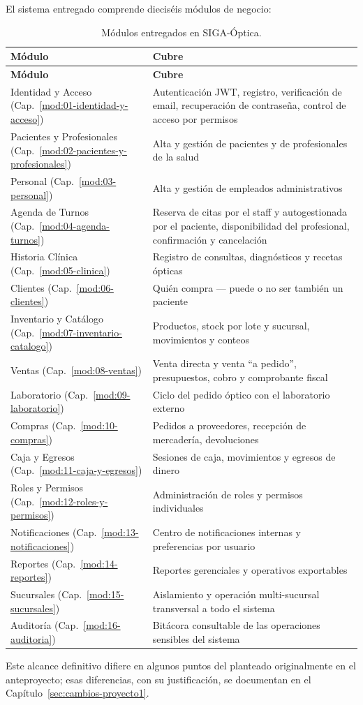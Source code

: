 El sistema entregado comprende dieciséis módulos de negocio:

\begin{longtable}{p{4.2cm}p{9.4cm}}
\caption{Módulos entregados en SIGA-Óptica.}
\label{tab:resumen-modulos}\\
\toprule
\textbf{Módulo} & \textbf{Cubre} \\
\midrule
\endfirsthead
\toprule
\textbf{Módulo} & \textbf{Cubre} \\
\midrule
\endhead
\bottomrule
\endfoot
Identidad y Acceso (Cap.~\ref{mod:01-identidad-y-acceso}) & Autenticación JWT, registro, verificación de email, recuperación de contraseña, control de acceso por permisos \\
Pacientes y Profesionales (Cap.~\ref{mod:02-pacientes-y-profesionales}) & Alta y gestión de pacientes y de profesionales de la salud \\
Personal (Cap.~\ref{mod:03-personal}) & Alta y gestión de empleados administrativos \\
Agenda de Turnos (Cap.~\ref{mod:04-agenda-turnos}) & Reserva de citas por el staff y autogestionada por el paciente, disponibilidad del profesional, confirmación y cancelación \\
Historia Clínica (Cap.~\ref{mod:05-clinica}) & Registro de consultas, diagnósticos y recetas ópticas \\
Clientes (Cap.~\ref{mod:06-clientes}) & Quién compra --- puede o no ser también un paciente \\
Inventario y Catálogo (Cap.~\ref{mod:07-inventario-catalogo}) & Productos, stock por lote y sucursal, movimientos y conteos \\
Ventas (Cap.~\ref{mod:08-ventas}) & Venta directa y venta ``a pedido'', presupuestos, cobro y comprobante fiscal \\
Laboratorio (Cap.~\ref{mod:09-laboratorio}) & Ciclo del pedido óptico con el laboratorio externo \\
Compras (Cap.~\ref{mod:10-compras}) & Pedidos a proveedores, recepción de mercadería, devoluciones \\
Caja y Egresos (Cap.~\ref{mod:11-caja-y-egresos}) & Sesiones de caja, movimientos y egresos de dinero \\
Roles y Permisos (Cap.~\ref{mod:12-roles-y-permisos}) & Administración de roles y permisos individuales \\
Notificaciones (Cap.~\ref{mod:13-notificaciones}) & Centro de notificaciones internas y preferencias por usuario \\
Reportes (Cap.~\ref{mod:14-reportes}) & Reportes gerenciales y operativos exportables \\
Sucursales (Cap.~\ref{mod:15-sucursales}) & Aislamiento y operación multi-sucursal transversal a todo el sistema \\
Auditoría (Cap.~\ref{mod:16-auditoria}) & Bitácora consultable de las operaciones sensibles del sistema \\
\end{longtable}

Este alcance definitivo difiere en algunos puntos del planteado originalmente en el anteproyecto; esas diferencias, con su justificación, se documentan en el Capítulo~\ref{sec:cambios-proyecto1}.
